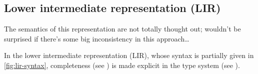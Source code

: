 \documentclass[index.tex]{subfiles}
\begin{document}
\newcommand{\CAnd}[2]{\ensuremath{#1 \SyAnd #2}}
\newcommand{\COr}[2]{\ensuremath{#1 \SyOr #2}}

\newcommand{\CLam}[3]{\ensuremath{\SyFun #1 : #2 \SyDot~ #3}}
\newcommand{\CAp}[2]{\ensuremath{#1 ~#2}}

\newcommand{\CLet}[2]{\ensuremath{\SyLet~ #1 = #2}}
\newcommand{\CIn}{\ensuremath{~\SyIn~}}
\newcommand{\CInWith}[1]{\ensuremath{~\SyIn~ #1}}
\newcommand{\CReturn}[1]{\ensuremath{\SyReturn~ #1}}

\newcommand{\CPair}[2]{\ensuremath{(#1, #2)}}
\newcommand{\CProjL}[1]{\ensuremath{\SyProjL~ #1}}
\newcommand{\CProjR}[1]{\ensuremath{\SyProjR~ #1}}

\newcommand{\CWrapIntoNI}[1]{\ensuremath{\SyWrap^{\KNI}~ #1}}
\newcommand{\CWrapIntoII}[1]{\ensuremath{\SyWrap^{\KII}~ #1}}
\newcommand{\CEmbed}[1]{\ensuremath{\SyEmbed~ #1}}
\newcommand{\CProj}[2]{\ensuremath{\SyProj[#2]~ #1}}
\newcommand{\CCaseCompleteWith}[1]{\ensuremath{\SyCaseComplete~ #1 ~\SyWith}}
\newcommand{\CCaseCompleteBr}[2]{\ensuremath{\SyBar~ #1 \SyArrow #2}}

\subsection{Lower intermediate representation (LIR)}
\label{sec:lir}

\begin{note}
  The semantics of this representation are not totally thought out; wouldn't be surprised if there's
  some big inconsistency in this approach\ldots
\end{note}

In the lower intermediate representation (LIR), whose syntax is partially given in
\cref{fig:lir-syntax}, completeness (see ) is made explicit in the type
system (see ).
\end{document}
